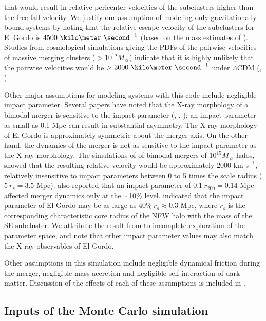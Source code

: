 \documentclass[letterpaper,useAMS,usenatbib]{mn2e}
\begin{document}
that would result in relative pericenter velocities of the subclusters
higher than the free-fall velocity. We justify our assumption of
modeling only gravitationally bound systems by noting that the relative escape
velocity of the subclusters for El Gordo is
$4500~\kilo\meter~\second^{-1}$ (based on the mass estimates of
\cite{Jee13}). Studies from cosmological simulations giving the PDFs of the pairwise
velocities of massive merging clusters ($>10^{15} M_{\sun}$) indicate that it
is highly unlikely that the pairwise velocities would be $> 3000~\kilo
\meter~\second^{-1}$ under $\Lambda$CDM (\citealt{Thompson12},
\citealt{Lee2010}).\par
Other major assumptions for modeling systems with this code include negligible impact parameter.
Several papers have noted that the X-ray morphology of a bimodal merger is
sensitive to the impact parameter (\citealt{Springel2007},
\citealt{Ricker98}, \citealt{Mastropietro2008a}); an impact
parameter as small as 0.1 Mpc can result in substantial asymmetry. 
The X-ray morphology of El Gordo is approximately symmetric about the merger axis. 
On the other hand, the dynamics of the merger is not as sensitive to the
impact parameter as the X-ray morphology. The simulations of
\cite{Ricker98} of bimodal mergers of $10^{15} M_{\sun}$ halos, showed that the
resulting relative velocity would be approximately $2000 \text{ km s}^{-1}$, relatively
insensitive to impact parameters between 0 to 5 times the scale radius ($5~r_s = 3.5$ Mpc). \cite{Mastropietro2008a} also reported that
an impact parameter of $0.1~r_{200} = 0.14$ Mpc affected merger dynamics only
at the $\sim$10\% level. \citealt{Molnar14} indicated that the impact parameter of El Gordo
may be as large as $40\%~r_s \approx 0.3$ Mpc, where $r_s$ is
the corresponding characteristic core
radius of the NFW halo with the mass of the SE subcluster. We attribute
the result from \citealt{Molnar14} to incomplete exploration of
the parameter space, and note that other impact parameter values may also match the
X-ray observables of El Gordo. \par
Other assumptions in this simulation include negligible dynamical friction
during the merger, negligible mass accretion and negligible self-interaction
of dark matter. Discussion of the effects of each of these assumptions is
included in .  
\subsection{Inputs of the Monte Carlo simulation} \label{sec:inputs}
\end{document}
